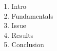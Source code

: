 \documentclass[preview]{standalone}
\begin{document}
\begin{center}
1. Intro\\ 2. Fundamentals\\ 3. Issue\\ 4. Results\\ 5. Conclusion
\end{center}
\end{document}
